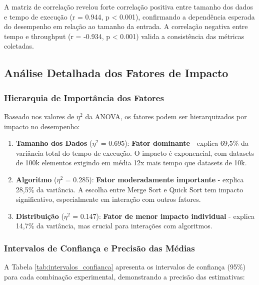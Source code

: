 \documentclass[conference]{IEEEtran}
\begin{document}
A matriz de correlação revelou forte correlação positiva entre tamanho dos dados e tempo de execução (r = 0.944, p < 0.001), confirmando a dependência esperada do desempenho em relação ao tamanho da entrada. A correlação negativa entre tempo e throughput (r = -0.934, p < 0.001) valida a consistência das métricas coletadas.

\subsection{Análise Detalhada dos Fatores de Impacto}

\subsubsection{Hierarquia de Importância dos Fatores}

Baseado nos valores de $\eta^2$ da ANOVA, os fatores podem ser hierarquizados por impacto no desempenho:

\begin{enumerate}
\item \textbf{Tamanho dos Dados} ($\eta^2$ = 0.695): \textbf{Fator dominante} - explica 69,5\% da variância total do tempo de execução. O impacto é exponencial, com datasets de 100k elementos exigindo em média 12x mais tempo que datasets de 10k.

\item \textbf{Algoritmo} ($\eta^2$ = 0.285): \textbf{Fator moderadamente importante} - explica 28,5\% da variância. A escolha entre Merge Sort e Quick Sort tem impacto significativo, especialmente em interação com outros fatores.

\item \textbf{Distribuição} ($\eta^2$ = 0.147): \textbf{Fator de menor impacto individual} - explica 14,7\% da variância, mas crucial para interações com algoritmos.
\end{enumerate}

\subsubsection{Intervalos de Confiança e Precisão das Médias}

A Tabela \ref{tab:intervalos_confianca} apresenta os intervalos de confiança (95\%) para cada combinação experimental, demonstrando a precisão das estimativas:
\end{document}
